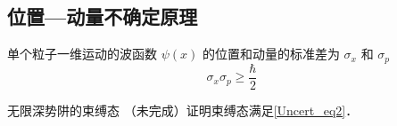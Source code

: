 

\subsection{位置—动量不确定原理}
单个粒子一维运动的波函数 $\psi(x)$ 的位置和动量的标准差为 $\sigma_x$ 和 $\sigma_p$
\begin{equation}\label{Uncert_eq2}
\sigma_x \sigma_p \geqslant \frac{\hbar}{2}
\end{equation}

\begin{example}{无限深势阱的束缚态}\label{Uncert_ex2}
（未完成）证明束缚态满足\autoref{Uncert_eq2}．
\end{example}

